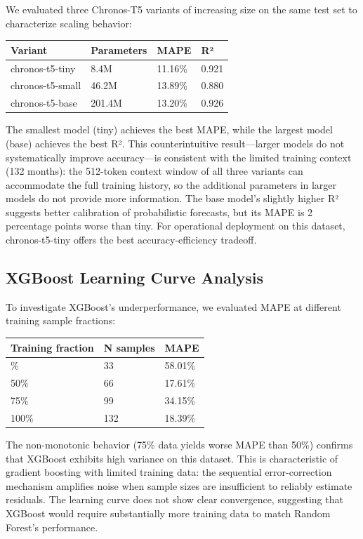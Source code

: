 \documentclass[
]{article}
\begin{document}
We evaluated three Chronos-T5 variants of increasing size on the same
test set to characterize scaling behavior:

\begin{longtable}[]{@{}llll@{}}
\toprule\noalign{}
Variant & Parameters & MAPE & R² \\
\midrule\noalign{}
\endhead
\bottomrule\noalign{}
\endlastfoot
chronos-t5-tiny & 8.4M & 11.16\% & 0.921 \\
chronos-t5-small & 46.2M & 13.89\% & 0.880 \\
chronos-t5-base & 201.4M & 13.20\% & 0.926 \\
\end{longtable}

The smallest model (tiny) achieves the best MAPE, while the largest
model (base) achieves the best R². This counterintuitive result---larger
models do not systematically improve accuracy---is consistent with the
limited training context (132 months): the 512-token context window of
all three variants can accommodate the full training history, so the
additional parameters in larger models do not provide more information.
The base model's slightly higher R² suggests better calibration of
probabilistic forecasts, but its MAPE is 2 percentage points worse than
tiny. For operational deployment on this dataset, chronos-t5-tiny offers
the best accuracy-efficiency tradeoff.

\subsection{XGBoost Learning Curve
Analysis}\label{xgboost-learning-curve-analysis}

To investigate XGBoost's underperformance, we evaluated MAPE at
different training sample fractions:

\begin{longtable}[]{@{}lll@{}}
\toprule\noalign{}
Training fraction & N samples & MAPE \\
\midrule\noalign{}
\endhead
\bottomrule\noalign{}
\endlastfoot
25\% & 33 & 58.01\% \\
50\% & 66 & 17.61\% \\
75\% & 99 & 34.15\% \\
100\% & 132 & 18.39\% \\
\end{longtable}

The non-monotonic behavior (75\% data yields worse MAPE than 50\%)
confirms that XGBoost exhibits high variance on this dataset. This is
characteristic of gradient boosting with limited training data: the
sequential error-correction mechanism amplifies noise when sample sizes
are insufficient to reliably estimate residuals. The learning curve does
not show clear convergence, suggesting that XGBoost would require
substantially more training data to match Random Forest's performance.
\end{document}

